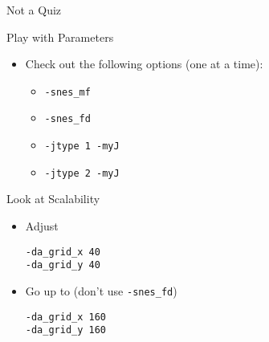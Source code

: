\begin{frame}[fragile]{Not a Quiz}

  \begin{block}{Play with Parameters}
    \begin{itemize}
     \item Check out the following options (one at a time):
        \begin{itemize}
         \item \lstinline|-snes_mf|
         \item \lstinline|-snes_fd|
         \item \lstinline|-jtype 1 -myJ|
         \item \lstinline|-jtype 2 -myJ|
        \end{itemize}
    \end{itemize}
  \end{block}

  \begin{block}{Look at Scalability}
    \begin{itemize}
     \item Adjust
 \begin{lstlisting}
-da_grid_x 40 
-da_grid_y 40
 \end{lstlisting}
     \item Go up to (don't use \lstinline|-snes_fd|)
 \begin{lstlisting}
-da_grid_x 160 
-da_grid_y 160
 \end{lstlisting}
    \end{itemize}
  \end{block}

\end{frame}



